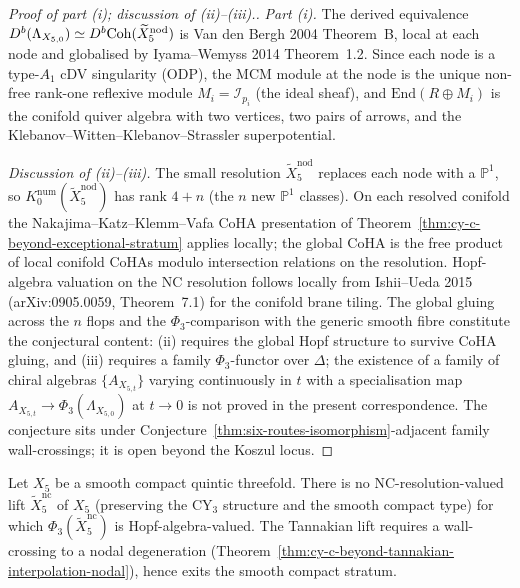 \begin{proof}[Proof of part (i); discussion of (ii)--(iii).]
\emph{Part (i).} The derived equivalence
$D^b(\Lambda_{X_{5,0}}) \simeq D^b\mathrm{Coh}(\widetilde X_5^{\mathrm{nod}})$
is Van den Bergh 2004 Theorem~B, local at each node and globalised
by Iyama--Wemyss 2014 Theorem~1.2. Since each node is a type-$A_1$ cDV
singularity (ODP), the MCM module at the node is the unique non-free
rank-one reflexive module $M_i = \mathcal I_{p_i}$ (the ideal sheaf),
and $\mathrm{End}(R \oplus M_i)$ is the conifold quiver algebra with
two vertices, two pairs of arrows, and the
Klebanov--Witten--Klebanov--Strassler superpotential.

\emph{Discussion of (ii)--(iii).} The small resolution
$\widetilde X_5^{\mathrm{nod}}$ replaces each node with a
$\mathbb P^1$, so $K_0^{\mathrm{num}}(\widetilde X_5^{\mathrm{nod}})$
has rank $4 + n$ (the $n$ new $\mathbb P^1$ classes). On each
resolved conifold the Nakajima--Katz--Klemm--Vafa CoHA presentation
of Theorem~\ref{thm:cy-c-beyond-exceptional-stratum} applies locally;
the global CoHA is the free product of local conifold CoHAs modulo
intersection relations on the resolution. Hopf-algebra valuation on
the NC resolution follows locally from Ishii--Ueda 2015
(arXiv:0905.0059, Theorem~7.1) for the conifold brane tiling.
The global gluing across the $n$ flops and the $\Phi_3$-comparison
with the generic smooth fibre constitute the conjectural content:
(ii) requires the global Hopf structure to survive CoHA gluing, and
(iii) requires a family $\Phi_3$-functor over $\Delta$; the
existence of a family of chiral algebras $\{A_{X_{5,t}}\}$ varying
continuously in $t$ with a specialisation map
$A_{X_{5,t}} \to \Phi_3(\Lambda_{X_{5,0}})$ at $t \to 0$ is not proved
in the present correspondence. The conjecture sits under
Conjecture~\ref{thm:six-routes-isomorphism}-adjacent family
wall-crossings; it is open beyond the Koszul locus.
\end{proof}

\begin{corollary}
\label{cor:cy-c-beyond-smooth-quintic-no-tannakian-lift}
Let $X_5$ be a smooth compact quintic threefold. There is no
NC-resolution-valued lift $\widetilde X_5^{\mathrm{nc}}$ of $X_5$
(preserving the CY$_3$ structure and the smooth compact type) for
which $\Phi_3(\widetilde X_5^{\mathrm{nc}})$ is Hopf-algebra-valued.
The Tannakian lift requires a wall-crossing to a nodal degeneration
(Theorem~\ref{thm:cy-c-beyond-tannakian-interpolation-nodal}),
hence exits the smooth compact stratum.
\end{corollary}

